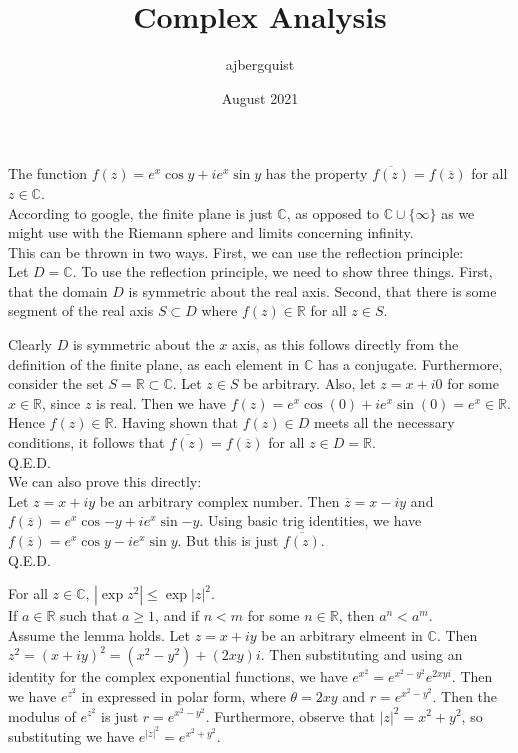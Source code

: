 \documentclass{article}
\title{Complex Analysis}
\author{ajbergquist }
\date{August 2021}
\theoremstyle{definition}
\newcommand{\R}{\mathbb{R}}
\newcommand{\C}{\mathbb{C}}
\newcommand{\cs}[1]{\color{blue}{#1}\normalcolor}
\begin{document}
 The function $f(z) = e^x \cos y + ie^x \sin y$ has the property $\overline{f(z)} = f(\overline{z})$ for all $z\in \C$.\\

 According to google, the finite plane is just $\C$, as opposed to $\C\cup \{\infty\}$ as we might use with the Riemann sphere and limits concerning infinity. \\

 This can be thrown \cs{Thrown?} in two ways. First, we can use the reflection principle:\\

Let $D = \C$. To use the reflection principle, we need to show three things. First, that the domain $D$ is symmetric about the real axis. Second, that there is some segment of the real axis $S\subset D$ where $f(z) \in \R$ for all $z\in S$.\\ \cs{Third?}

Clearly $D$ is symmetric about the $x$ axis, as this follows directly from the definition of the finite plane, as each element in $\C$ has a conjugate. Furthermore, consider the set $S = \R \subset \C$. Let $z\in S$ be arbitrary. Also, let $z = x + i0$ for some $x\in \R$, since $z$ is real. Then we have $f(z) = e^x\cos(0) + ie^x \sin(0) = e^x \in \R$. Hence $f(z)\in \R$. Having shown that $f(z)\in D$ meets all the necessary conditions, it follows that $\overline{f(z)} = f(\overline{z})$ for all $z\in D = \R$. \\
Q.E.D.\\

We can also prove this directly:\\

Let $z = x+ iy$ be an arbitrary complex number. Then $\overline{z} = x - iy$ and $f(\overline{z}) = e^x\cos{-y}+ie^x\sin{-y}$. Using basic trig identities, we have $f(\overline{z}) = e^x \cos y - ie^x\sin y$. But this is just $\overline{f(z)}.$\\
Q.E.D.\\

\cs{5/5}



 For all $z\in \C$, $|\exp{z^2}|\le \exp{|z|^2}$.\\

 If $a\in \R$ such that $a \ge 1$, and if $n < m$ for some $n\in \R$, then $a^n < a^m$.\\

 Assume the lemma holds. Let $z = x + iy$ be an arbitrary elmeent in $\C$. Then $z^2 = (x + iy)^2 = (x^2 - y^2) + (2xy)i$. Then substituting and using an identity for the complex exponential functions, we have $e^{x^2} = e^{x^2 - y^2}e^{2xyi}.$ Then we have $e^{z^2}$ in expressed in polar form, where $\theta = 2xy$ and $r = e^{x^2 - y^2}$. Then the modulus of $e^{z^2}$ is just $r = e^{x^2 - y^2}$. Furthermore, observe that $|z|^2 = x^2 + y^2$, so substituting we have $e^{|z|^2} = e^{x^2+y^2}$.\\
\end{document}
